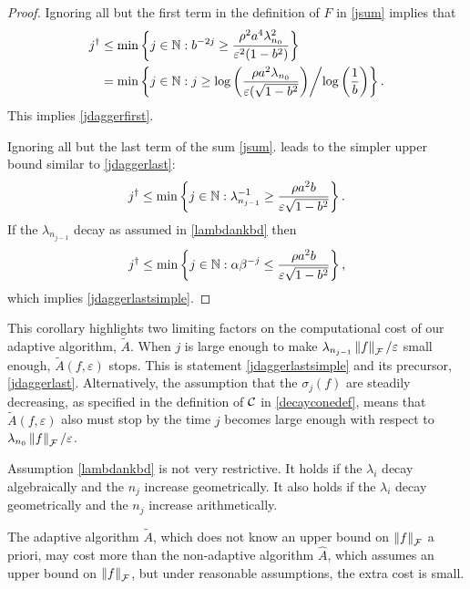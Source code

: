 \documentclass[graybox,footinfo]{svmult}
\newcommand{\DHJRnorm}[2][{}]{\ensuremath{\left \lVert #2 \right \rVert}_{#1}}
\begin{document}
\begin{proof}
Ignoring all but the first term in the definition of $F$ in \eqref{jsum} implies that 
\begin{align*} \label{jsumupperbd}
j^\dagger & \le \min \left \{j \in \bbN : b^{-2j}  \ge  \frac{\rho^2 a^4 \lambda_{n_{0}}^2 }{\varepsilon^2(1 - b^2)} \right\} \\
& = 
\min \left \{j \in \bbN : j  \ge  \log\left(\frac{\rho a^2 \lambda_{n_{0}} }{\varepsilon(\sqrt{1 - b^2}}\right) \middle/ \log\left(\frac 1b \right) \right\}.
\end{align*}
This implies \eqref{jdaggerfirst}.

Ignoring all but the last term of the sum \eqref{jsum}. leads to the simpler upper bound similar to  \eqref{jdaggerlast}: 
\begin{equation*} 
j^\dagger \le \min \left \{j \in {\mathbb{N}} :  \lambda_{n_{j-1}}^{-1} \ge \frac{ \rho a^2b}{ \varepsilon\sqrt{1 - b^2}} \right\}.
\end{equation*}
If the $\lambda_{n_{j-1}}$ decay as assumed in \eqref{lambdankbd} then
\[
j^\dagger \le \min \left \{j \in {\mathbb{N}} :  \alpha \beta^{-j} \le \frac{\rho a^2b }{ \varepsilon\sqrt{1 - b^2}} \right\},
\]
which implies \eqref{jdaggerlastsimple}.
\end{proof}

This corollary highlights two limiting factors on the computational cost of our adaptive algorithm, $\widetilde{A}$. When $j$ is large enough to make $\lambda_{n_{j-1}}\DHJRnorm[\calF]{f}/\varepsilon$ small enough, $\widetilde{A}(f,\varepsilon)$ stops.  This is statement \eqref{jdaggerlastsimple} 
and its precursor, \eqref{jdaggerlast}.  Alternatively, the assumption that the $\sigma_j(f)$ are steadily decreasing, as specified in the definition of ${\mathcal{C}}$ in \eqref{decayconedef}, means that $\widetilde{A}(f,\varepsilon)$ also must stop by the time $j$ becomes large enough with respect to $\lambda_{n_0}\DHJRnorm[\calF]{f}/\varepsilon$.

Assumption \eqref{lambdankbd} is not very restrictive.  It holds if the $\lambda_i$ decay algebraically and the $n_j$ increase geometrically.  It also holds if the $\lambda_i$ decay geometrically and the $n_j$ increase arithmetically.

The adaptive algorithm $\widetilde{A}$, which does not know an upper bound on $\DHJRnorm[\calF]{f}$ a priori, may cost more than the non-adaptive algorithm $\widehat{A}$, which assumes an upper bound on $\DHJRnorm[\calF]{f}$, but under reasonable assumptions, the extra cost is small.
\end{document}
